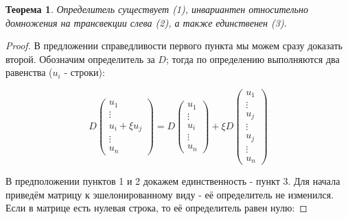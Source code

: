 \documentclass[a4paper,100pt]{article}
\theoremstyle{indented}
\newtheorem{theorem}{Теорема}
\theoremstyle{definition}
\theoremstyle{remark}
\begin{document}
\begin{theorem}
    Определитель существует (1), инвариантен относительно домножения на трансвекции слева (2), а также единственен (3).
\end{theorem}

\begin{proof}
    В предложении справедливости первого пункта мы можем сразу доказать второй. Обозначим определитель за $D$; тогда по определению выполняются два равенства ($u_i$ - строки):

    \begin{equation*}
        D
        \begin{pmatrix}
            u_1\\
            \vdots\\
            u_i+\xi u_j \\
            \vdots \\
            u_n
        \end{pmatrix}
        =D
        \begin{pmatrix}
            u_1\\
            \vdots\\
            u_i\\
            \vdots \\
            u_n
        \end{pmatrix}
        +\xi D
        \begin{pmatrix}
            u_1\\
            \vdots\\
            u_j\\
            \vdots\\
            u_j\\
            \vdots \\
            u_n
        \end{pmatrix}
    \end{equation*}

    В предположении пунктов 1 и 2 докажем единственность - пункт 3. Для начала приведём матрицу к эшелонированному виду - её определитель не изменился. Если в матрице есть нулевая строка, то её определитель равен нулю:


\end{proof}
\end{document}
